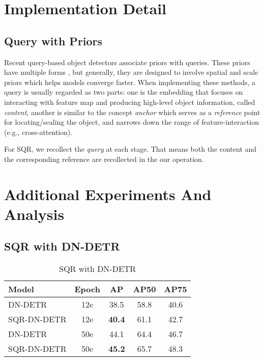 \documentclass[10pt,twocolumn,letterpaper]{article}
\begin{document}
{\small


}

\newcommand{\beginsupplement}{\setcounter{table}{0}
        \renewcommand{\thetable}{S\arabic{table}}\setcounter{figure}{0}
        \renewcommand{\thefigure}{S\arabic{figure}}}

\appendix
\beginsupplement
\section{Implementation Detail}
\subsection{Query with Priors}
Recent query-based object detectors associate priors with queries.  These priors have multiple forms \cite{Gao2022AdaMixerAF,Liu2022DABDETRDA, Wang2022AnchorDQ, Meng2021ConditionalDF}, but generally, they are designed to involve spatial and scale priors which helps models converge faster. When implementing these methods, a query is usually regarded as two parts: one is the embedding that focuses on interacting with feature map and producing high-level object information, called \emph{content}, another is similar to the concept \emph{anchor}\cite{Ren2015FasterRT} which serves as a \emph{reference} point for locating/scaling the object, and narrows down the range of feature-interaction (e.g., cross-attention). 

For SQR, we recollect the \emph{query} at each stage. That means both the content and the corresponding reference are recollected in the our operation. 


\section{Additional Experiments And Analysis}

\subsection{SQR with DN-DETR}
\begin{table}[h]
\centering
    \begin{tabular}{l|c|c|c|c}
    \toprule[1pt]
        Model &  Epoch &  AP & AP50 & AP75 \\ 
        \midrule
        DN-DETR \cite{Li2022DNDETRAD}        & 12e & 38.5 & 58.8 & 40.6 \\ 
        SQR-DN-DETR    & 12e & \textbf{40.4} & 61.1 & 42.7 \\
        \midrule
        DN-DETR \cite{Li2022DNDETRAD}        & 50e & 44.1 & 64.4 & 46.7 \\ 
        SQR-DN-DETR    & 50e & \textbf{45.2} & 65.7 & 48.3 \\
       \bottomrule
    \end{tabular}
    \caption{SQR with DN-DETR}
    \label{tab:SQR-DN-DETR}
\end{table}
\end{document}
